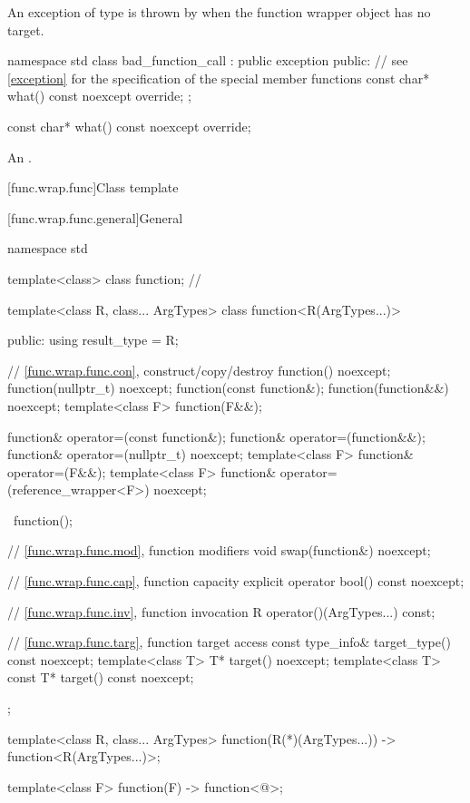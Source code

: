 \pnum
An exception of type  is thrown by
when the function wrapper object has no target.

\begin{codeblock}
namespace std {
  class bad_function_call : public exception {
  public:
    // see \ref{exception} for the specification of the special member functions
    const char* what() const noexcept override;
  };
}
\end{codeblock}

%
\begin{itemdecl}
const char* what() const noexcept override;
\end{itemdecl}

\begin{itemdescr}
\pnum
\returns
An
 \ntbs{}.
\end{itemdescr}

[func.wrap.func]{Class template }

[func.wrap.func.general]{General}
%

%
\begin{codeblock}
namespace std {
  template<class> class function;       // \notdef

  template<class R, class... ArgTypes>
  class function<R(ArgTypes...)> {
  public:
    using result_type = R;

    // \ref{func.wrap.func.con}, construct/copy/destroy
    function() noexcept;
    function(nullptr_t) noexcept;
    function(const function&);
    function(function&&) noexcept;
    template<class F> function(F&&);

    function& operator=(const function&);
    function& operator=(function&&);
    function& operator=(nullptr_t) noexcept;
    template<class F> function& operator=(F&&);
    template<class F> function& operator=(reference_wrapper<F>) noexcept;

    ~function();

    // \ref{func.wrap.func.mod}, function modifiers
    void swap(function&) noexcept;

    // \ref{func.wrap.func.cap}, function capacity
    explicit operator bool() const noexcept;

    // \ref{func.wrap.func.inv}, function invocation
    R operator()(ArgTypes...) const;

    // \ref{func.wrap.func.targ}, function target access
    const type_info& target_type() const noexcept;
    template<class T>       T* target() noexcept;
    template<class T> const T* target() const noexcept;
  };

  template<class R, class... ArgTypes>
    function(R(*)(ArgTypes...)) -> function<R(ArgTypes...)>;

  template<class F> function(F) -> function<@\seebelow@>;
}
\end{codeblock}

